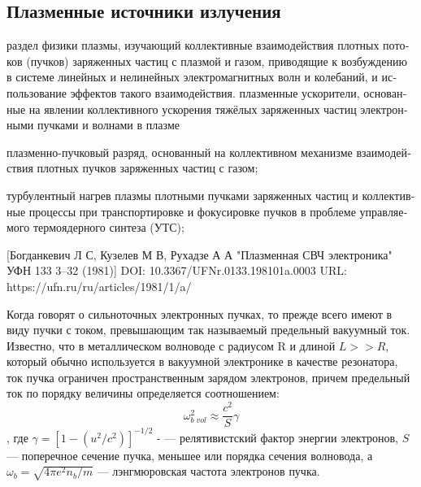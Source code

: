 \documentclass[10pt, a4paper]{article}
\begin{document}
\subsection{Плазменные источники излучения}
\label{14.4} 
раз­дел фи­зи­ки плаз­мы, изу­чаю­щий кол­лек­тив­ные взаи­мо­дей­ст­вия плот­ных по­то­ков (пуч­ков) за­ря­жен­ных час­тиц с плаз­мой и га­зом, при­во­дя­щие к воз­бу­ж­де­нию в сис­те­ме ли­ней­ных и не­ли­ней­ных элек­тро­маг­нит­ных волн и ко­ле­ба­ний, и ис­поль­зо­ва­ние эф­фек­тов та­ко­го взаи­мо­дей­ст­вия.
плаз­мен­ные ус­ко­ри­те­ли, ос­но­ван­ные на яв­ле­нии кол­лек­тив­но­го ус­ко­ре­ния тя­жё­лых за­ря­жен­ных час­тиц элек­трон­ны­ми пуч­ка­ми и вол­на­ми в плаз­ме

плаз­мен­но-пуч­ко­вый раз­ряд, ос­но­ван­ный на кол­лек­тив­ном ме­ха­низ­ме взаи­мо­дей­ст­вия плот­ных пуч­ков за­ря­жен­ных час­тиц с га­зом;

тур­бу­лент­ный на­грев плаз­мы плот­ны­ми пуч­ка­ми за­ря­жен­ных час­тиц и кол­лек­тив­ные про­цес­сы при транс­пор­ти­ров­ке и фо­ку­си­ров­ке пуч­ков в про­бле­ме управ­ляе­мо­го тер­мо­ядер­но­го син­те­за (УТС);

[Богданкевич Л С, Кузелев М В, Рухадзе А А "Плазменная СВЧ электроника" УФН 133 3–32 (1981)]
DOI: 10.3367/UFNr.0133.198101a.0003
URL: https://ufn.ru/ru/articles/1981/1/a/

Когда говорят о сильноточных электронных пучках, то прежде всего имеют в виду пучки с током, превышающим так называемый предельный вакуумный ток. Известно, что в металлическом волноводе с радиусом R и длиной $L >> R$, который обычно используется в вакуумной электронике в качестве резонатора, ток пучка ограничен пространственным зарядом электронов, причем предельный ток по порядку величины определяется соотношением:
\begin{equation}
	\omega_{b \; vol}^{2} \approx \frac{c^{2}}{S} \gamma
\end{equation}
, где $\gamma = [1-(u^{2}/c^{2})]^{-1/2}$ - — релятивистский фактор энергии электронов, $S$ — поперечное сечение пучка, меньшее или порядка сечения волновода, а $\omega_{b}=\sqrt{4\pi e^{2} n_{b} /m}$ — лэнгмюровская частота электронов пучка. 
\end{document}
